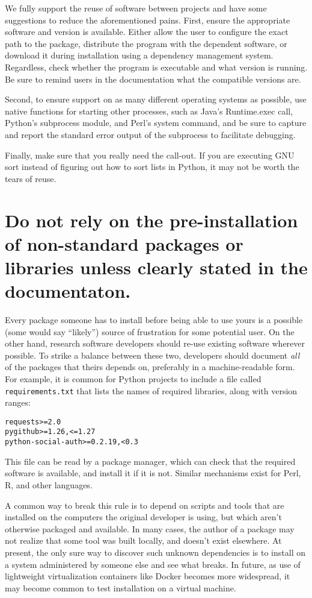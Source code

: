 \documentclass[10pt]{article}
\begin{document}
We fully support the reuse of software between projects and have some
suggestions to reduce the aforementioned pains. First, ensure the
appropriate software and version is available. Either allow the user to
configure the exact path to the package, distribute the program with the
dependent software, or download it during installation using a
dependency management system. Regardless, check whether the program is
executable and what version is running. Be sure to remind users in the
documentation what the compatible versions are.

Second, to ensure support on as many different operating systems as
possible, use native functions for starting other processes, such as
Java's Runtime.exec call, Python's subprocess module, and Perl's system
command, and be sure to capture and report the standard error output of
the subprocess to facilitate debugging.

Finally, make sure that you really need the call-out. If you are
executing GNU sort instead of figuring out how to sort lists in Python,
it may not be worth the tears of reuse.

\section{Do not rely on the pre-installation of non-standard packages or libraries unless clearly stated in the documentaton.}

Every package someone has to install before being able to use yours is a
possible (some would say ``likely'') source of frustration for some
potential user. On the other hand, research software developers should
re-use existing software wherever possible. To strike a balance between
these two, developers should document \emph{all} of the packages that
theirs depends on, preferably in a machine-readable form. For example,
it is common for Python projects to include a file called
\texttt{requirements.txt} that lists the names of required libraries,
along with version ranges:

\begin{verbatim}
requests>=2.0
pygithub>=1.26,<=1.27
python-social-auth>=0.2.19,<0.3
\end{verbatim}

This file can be read by a package manager, which can check that the
required software is available, and install it if it is not. Similar
mechanisms exist for Perl, R, and other languages.

A common way to break this rule is to depend on scripts and tools that
are installed on the computers the original developer is using, but
which aren't otherwise packaged and available. In many cases, the author
of a package may not realize that some tool was built locally, and
doesn't exist elsewhere. At present, the only sure way to discover such
unknown dependencies is to install on a system administered by someone
else and see what breaks. In future, as use of lightweight
virtualization containers like Docker becomes more widespread, it may
become common to test installation on a virtual machine.
\end{document}
